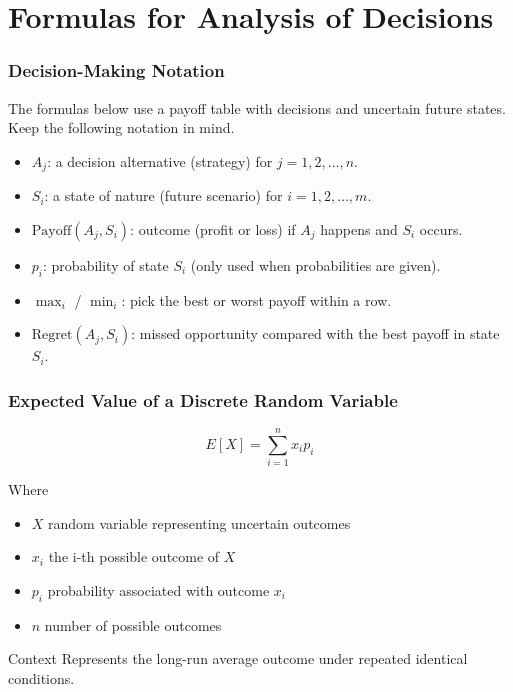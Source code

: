 \chapter{Formulas for Analysis of Decisions}\label{formulas-section}

\subsection{Decision-Making Notation}\label{formula-notation}

The formulas below use a payoff table with decisions and uncertain future states. Keep the following notation in mind.

\begin{itemize}
	\item \(A_j\): a decision alternative (strategy) for \(j = 1, 2, \dots, n\).
	\item \(S_i\): a state of nature (future scenario) for \(i = 1, 2, \dots, m\).
	\item \(\text{Payoff}(A_j,S_i)\): outcome (profit or loss) if \(A_j\) happens and \(S_i\) occurs.
	\item \(p_i\): probability of state \(S_i\) (only used when probabilities are given).
	\item \(\max_i\) / \(\min_i\): pick the best or worst payoff within a row.
	\item \(\text{Regret}(A_j,S_i)\): missed opportunity compared with the best payoff in state \(S_i\).
\end{itemize}
	
	\subsection{Expected Value of a Discrete Random Variable}\label{formula-expected-value}
	
	\[
	E[X] = \sum_{i=1}^{n} x_i p_i
	\]
	
	Where
	\begin{itemize}
		\item \(X\) random variable representing uncertain outcomes
		\item \(x_i\) the i-th possible outcome of \(X\)
		\item \(p_i\) probability associated with outcome \(x_i\)
		\item \(n\) number of possible outcomes
	\end{itemize}
	
	Context
	Represents the long-run average outcome under repeated identical conditions.
	
